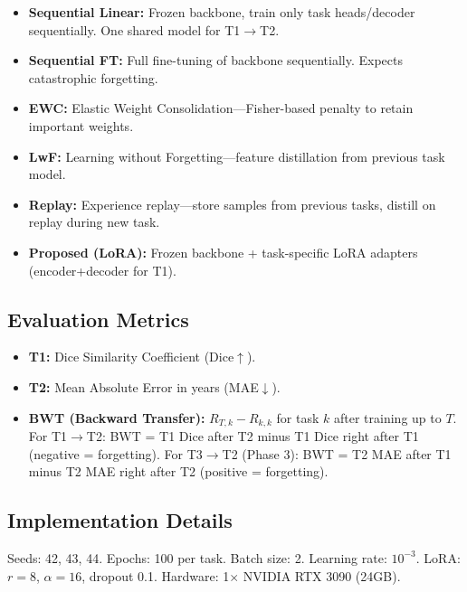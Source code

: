 \begin{itemize}
\item \textbf{Sequential Linear:} Frozen backbone, train only task heads/decoder sequentially. One shared model for T1$\to$T2.
\item \textbf{Sequential FT:} Full fine-tuning of backbone sequentially. Expects catastrophic forgetting.
\item \textbf{EWC:} Elastic Weight Consolidation---Fisher-based penalty to retain important weights.
\item \textbf{LwF:} Learning without Forgetting---feature distillation from previous task model.
\item \textbf{Replay:} Experience replay---store samples from previous tasks, distill on replay during new task.
\item \textbf{Proposed (LoRA):} Frozen backbone + task-specific LoRA adapters (encoder+decoder for T1).
\end{itemize}

\subsection{Evaluation Metrics}
\label{sec:metrics}

\begin{itemize}
\item \textbf{T1:} Dice Similarity Coefficient (Dice$\uparrow$).
\item \textbf{T2:} Mean Absolute Error in years (MAE$\downarrow$).
\item \textbf{BWT (Backward Transfer):} $R_{T,k} - R_{k,k}$ for task $k$ after training up to $T$. For T1$\to$T2: BWT = T1 Dice after T2 minus T1 Dice right after T1 (negative = forgetting). For T3$\to$T2 (Phase 3): BWT = T2 MAE after T1 minus T2 MAE right after T2 (positive = forgetting).
\end{itemize}

\subsection{Implementation Details}
\label{sec:impl}

Seeds: 42, 43, 44. Epochs: 100 per task. Batch size: 2. Learning rate: $10^{-3}$. LoRA: $r=8$, $\alpha=16$, dropout 0.1. Hardware: 1$\times$ NVIDIA RTX 3090 (24GB).
